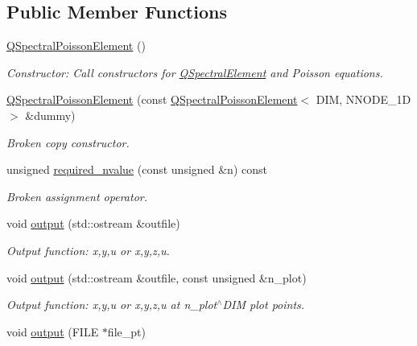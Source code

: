 \subsection*{Public Member Functions}
\begin{DoxyCompactItemize}
\item 
\hyperlink{classoomph_1_1QSpectralPoissonElement_a182407c61e120d9b2d62c44d2ba99139}{Q\+Spectral\+Poisson\+Element} ()
\begin{DoxyCompactList}\small\item\em Constructor\+: Call constructors for \hyperlink{classoomph_1_1QSpectralElement}{Q\+Spectral\+Element} and Poisson equations. \end{DoxyCompactList}\item 
\hyperlink{classoomph_1_1QSpectralPoissonElement_a4b8762d8403532d66e8ae9fbed409764}{Q\+Spectral\+Poisson\+Element} (const \hyperlink{classoomph_1_1QSpectralPoissonElement}{Q\+Spectral\+Poisson\+Element}$<$ D\+IM, N\+N\+O\+D\+E\+\_\+1D $>$ \&dummy)
\begin{DoxyCompactList}\small\item\em Broken copy constructor. \end{DoxyCompactList}\item 
unsigned \hyperlink{classoomph_1_1QSpectralPoissonElement_a6f37168c5ce1065a14b9a2a78df20539}{required\+\_\+nvalue} (const unsigned \&n) const
\begin{DoxyCompactList}\small\item\em Broken assignment operator. \end{DoxyCompactList}\item 
void \hyperlink{classoomph_1_1QSpectralPoissonElement_aa102e31f1f3c1f3040d69842aa0ad75a}{output} (std\+::ostream \&outfile)
\begin{DoxyCompactList}\small\item\em Output function\+: x,y,u or x,y,z,u. \end{DoxyCompactList}\item 
void \hyperlink{classoomph_1_1QSpectralPoissonElement_a09f0813f51286ed47f4e89536e8c4e2e}{output} (std\+::ostream \&outfile, const unsigned \&n\+\_\+plot)
\begin{DoxyCompactList}\small\item\em Output function\+: x,y,u or x,y,z,u at n\+\_\+plot$^\wedge$\+D\+IM plot points. \end{DoxyCompactList}\item 
void \hyperlink{classoomph_1_1QSpectralPoissonElement_ac5588896f64d8c24a896dc0b30e7ec29}{output} (F\+I\+LE $\ast$file\+\_\+pt)

\end{DoxyCompactItemize}
